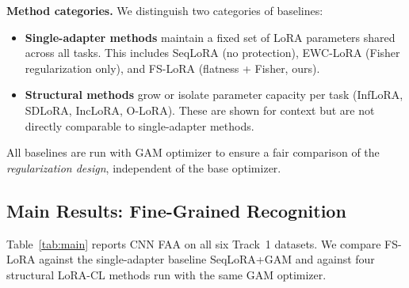 \textbf{Method categories.}
We distinguish two categories of baselines:
\begin{itemize}
  \item \textbf{Single-adapter methods} maintain a fixed set of LoRA parameters shared across all tasks.
    This includes SeqLoRA (no protection), EWC-LoRA (Fisher regularization only),
    and FS-LoRA (flatness + Fisher, ours).
  \item \textbf{Structural methods} grow or isolate parameter capacity per task
    (InfLoRA, SDLoRA, IncLoRA, O-LoRA).
    These are shown for context but are not directly comparable to single-adapter methods.
\end{itemize}
All baselines are run with GAM optimizer to ensure a fair comparison of the \emph{regularization design},
independent of the base optimizer.

\subsection{Main Results: Fine-Grained Recognition}
\label{sec:main_results}

Table~\ref{tab:main} reports CNN FAA on all six Track~1 datasets.
We compare FS-LoRA against the single-adapter baseline SeqLoRA+GAM
and against four structural LoRA-CL methods run with the same GAM optimizer.

